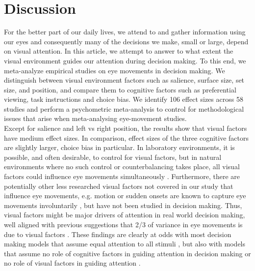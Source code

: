 \documentclass[english,natbib,man,floatsintext]{apa6}
\begin{document}


\section{Discussion}

For the better part of our daily lives, we attend to and gather information using our eyes and consequently many of the decisions we make, small or large, depend on visual attention. In this article, we attempt to answer to what extent the visual environment guides our attention during decision making. To this end, we meta-analyze empirical studies on eye movements in decision making. We distinguish between visual environment factors such as salience, surface size, set size, and position, and compare them to cognitive factors such as preferential viewing, task instructions and choice bias. We identify 106 effect sizes across 58 studies and perform a psychometric meta-analysis to control for methodological issues that arise when meta-analysing eye-movement studies.\\ 

Except for salience and left vs right position, the results show that visual factors have medium effect sizes. In comparison, effect sizes of the three cognitive factors are slightly larger, choice bias in particular. In laboratory environments, it is possible, and often desirable, to control for visual factors, but in natural environments where no such control or counterbalancing takes place, all visual factors could influence eye movements simultaneously \citep{orquin2019a}. Furthermore, there are potentially other less researched visual factors not covered in our study that influence eye movements, e.g. motion or sudden onsets are known to capture eye movements involuntarily \citep{abrams2003, jonides1988}, but have not been studied in decision making. Thus, visual factors might be major drivers of attention in real world decision making, well aligned with previous suggestions that 2/3 of variance in eye movements is due to visual factors \cite{vanderlans2008}. These findings are clearly at odds with most decision making models that assume equal attention to all stimuli \citep{tversky1979,payne1988, simon1956a}, but also with models that assume no role of cognitive factors in guiding attention in decision making \citep{busemeyer1992, krajbich2010a} or no role of visual factors in guiding attention \citep{callaway2019a, gloeckner2011a, gluth2018, gluth2020}.\\ 
\end{document}

